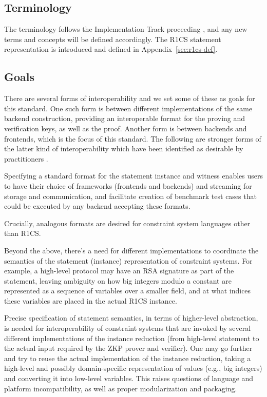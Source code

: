 \documentclass[a4paper,12pt]{article}
\begin{document}
\subsection{Terminology}
The terminology follows the Implementation Track proceeding \cite{ZKProofImplementation}, and any new terms and concepts will be defined accordingly. The R1CS statement representation is introduced and defined in Appendix~\ref{sec:r1cs-def}.

\subsection{Goals} 
\label{goals}

There are several forms of interoperability and we set some of these as goals for this standard. One such form is between different implementations of the same backend construction, providing an interoperable format for the proving and verification keys, as well as the proof. Another form is between backends and frontends, which is the focus of this standard. The following are stronger forms of the latter kind of interoperability which have been identified as desirable by practitioners \cite{ZKProofImplementation}.

Specifying a standard format for the statement instance and witness enables users to have their choice of frameworks (frontends and backends) and streaming for storage and communication, and facilitate creation of benchmark test cases that could be executed by any backend accepting these formats.
 
Crucially, analogous formats are desired for constraint system languages other than R1CS.


Beyond the above, there’s a need for different implementations to coordinate the semantics of the statement (instance) representation of constraint systems. For example, a high-level protocol may have an RSA signature as part of the statement, leaving ambiguity on how big integers modulo a constant are represented as a sequence of variables over a smaller field, and at what indices these variables are placed in the actual R1CS instance.

Precise specification of statement semantics, in terms of higher-level abstraction, is needed for interoperability of constraint systems that are invoked by several different implementations of the instance reduction (from high-level statement to the actual input required by the ZKP prover and verifier). One may go further and try to reuse the actual implementation of the instance reduction, taking a high-level and possibly domain-specific representation of values (e.g., big  integers) and converting it into low-level variables. This raises questions of language and platform incompatibility, as well as proper modularization and packaging.
\end{document}
